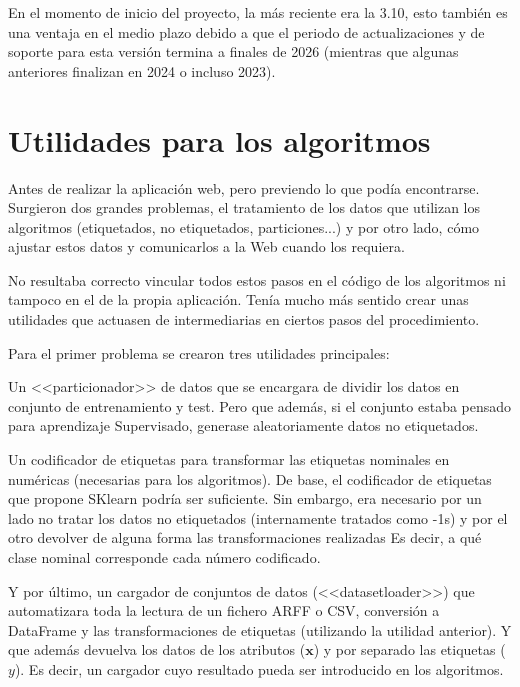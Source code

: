 En el momento de inicio del proyecto, la más reciente era la 3.10, esto también
es una ventaja en el medio plazo debido a que el periodo de actualizaciones y de
soporte para esta versión termina a finales de 2026 (mientras que algunas
anteriores finalizan en 2024 o incluso 2023).

\section{Utilidades para los algoritmos}

Antes de realizar la aplicación web, pero previendo lo que podía encontrarse.
Surgieron dos grandes problemas, el tratamiento de los datos que utilizan los
algoritmos (etiquetados, no etiquetados, particiones...) y por otro lado, cómo
ajustar estos datos y comunicarlos a la Web cuando los requiera.

No resultaba correcto vincular todos estos pasos en el código de los algoritmos
ni tampoco en el de la propia aplicación. Tenía mucho más sentido crear unas
utilidades que actuasen de intermediarias en ciertos pasos del procedimiento.

Para el primer problema se crearon tres utilidades principales: 

Un <<particionador>> de datos que se encargara de dividir los datos en conjunto
de entrenamiento y test. Pero que además, si el conjunto estaba pensado para
aprendizaje Supervisado, generase aleatoriamente datos no etiquetados.

Un codificador de etiquetas para transformar las etiquetas nominales en
numéricas (necesarias para los algoritmos). De base, el codificador de etiquetas
que propone SKlearn podría ser suficiente. Sin embargo, era necesario por un
lado no tratar los datos no etiquetados (internamente tratados como -1s) y por
el otro devolver de alguna forma las transformaciones realizadas Es decir, a qué
clase nominal corresponde cada número codificado.

Y por último, un cargador de conjuntos de datos (<<datasetloader>>) que
automatizara toda la lectura de un fichero ARFF o CSV, conversión a DataFrame y
las transformaciones de etiquetas (utilizando la utilidad anterior). Y que
además devuelva los datos de los atributos ($\mathbf{x}$) y por separado las
etiquetas ($y$). Es decir, un cargador cuyo resultado pueda ser introducido en los
algoritmos. 

